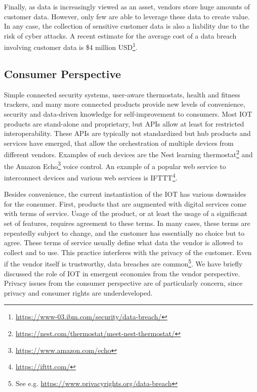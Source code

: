 Finally, as data is increasingly viewed as an asset, vendors store huge amounts of customer data. However, only few are able to leverage these data to create value. In any case, the collection of sensitive customer data is also a liability due to the risk of cyber attacks. A recent estimate for the average cost of a data breach involving customer data is \$4 million USD\footnote{\url{https://www-03.ibm.com/security/data-breach/}}.


\subsection{Consumer Perspective}

Simple connected security systems, user-aware thermostats, health and fitness trackers, and many more connected products provide new levels of convenience, security and data-driven knowledge for self-improvement to consumers. Most \ac{IOT} products are stand-alone and proprietary, but \ac{API}s allow at least for restricted interoperability. These \ac{API}s are typically not standardized but hub products and services have emerged, that allow the orchestration of multiple devices from different vendors. Examples of such devices are the Nest learning thermostat\footnote{\url{https://nest.com/thermostat/meet-nest-thermostat/}} and the Amazon Echo\footnote{\url{https://www.amazon.com/echo}} voice control. An example of a popular web service to interconnect devices and various web services is IFTTT\footnote{\url{https://ifttt.com/}}. 

Besides convenience, the current instantiation of the \ac{IOT} has various downsides for the consumer. First, products that are augmented with digital services come with terms of service. Usage of the product, or at least the usage of a significant set of features, requires agreement to these terms. In many cases, these terms are repeatedly subject to change, and the customer has essentially no choice but to agree. These terms of service usually define what data the vendor is allowed to collect and to use.
This practice interferes with the privacy of the customer. Even if the vendor itself is trustworthy, data breaches are common\footnote{See e.g. \url{https://www.privacyrights.org/data-breach}}. We have briefly discussed the role of \ac{IOT} in emergent economies from the vendor perspective. Privacy issues from the consumer perspective are of particularly concern, since privacy and consumer rights are underdeveloped.

